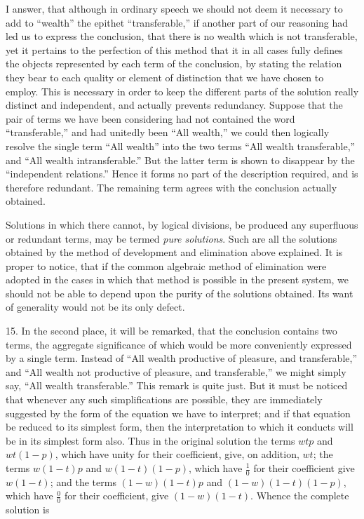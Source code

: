 \documentclass[oneside]{book}
\begin{document}
I answer, that although in ordinary speech we should not
deem it necessary to add to ``wealth'' the epithet ``transferable,''
if another part of our reasoning had led us to express the conclusion,
that there is no wealth which is not transferable, yet it
pertains to the perfection of this method that it in all cases fully
defines the objects represented by each term of the conclusion,
by stating the relation they bear to each quality or element of distinction
that we have chosen to employ. This is necessary in order
to keep the different parts of the solution really distinct and independent,
and actually prevents redundancy. Suppose that the
pair of terms we have been considering had not contained the
word ``transferable,'' and had unitedly been ``All wealth,'' we
could then logically resolve the single term ``All wealth'' into
the two terms ``All wealth transferable,'' and ``All wealth
intransferable.'' But the latter term is shown to disappear by
the ``independent relations.'' Hence it forms no part of the description
required, and is therefore redundant. The remaining
term agrees with the conclusion actually obtained.

Solutions in which there cannot, by logical divisions, be produced
any superfluous or redundant terms, may be termed \textit{pure
solutions}. Such are all the solutions obtained by the method of
development and elimination above explained. It is proper to
notice, that if the common algebraic method of elimination were
adopted in the cases in which that method is possible in the present
system, we should not be able to depend upon the purity of
the solutions obtained. Its want of generality would not be its
only defect.

15. In the second place, it will be remarked, that the conclusion
contains two terms, the aggregate significance of which
would be more conveniently expressed by a single term. Instead
of ``All wealth productive of pleasure, and transferable,'' and
``All wealth not productive of pleasure, and transferable,'' we
might simply say, ``All wealth transferable.'' This remark is
quite just. But it must be noticed that whenever any such simplifications
are possible, they are immediately suggested by the
form of the equation we have to interpret; and if that equation
be reduced to its simplest form, then the interpretation to which
it conducts will be in its simplest form also. Thus in the original
solution the terms $wtp$ and $wt(1 - p)$, which have unity for their
coefficient, give, on addition, $wt$; the terms $w \left(1 - t \right) p$ and
$w \left(1 - t \right) \left(1 - p \right)$, which have $\frac{1}{0}$ for their
coefficient give $w \left(1 - t \right)$;
and the terms $\left(1 - w \right) \left(1 - t \right)p$ and
$\left(1 - w \right) \left(1 - t \right) \left(1 -p \right)$, which
have $\frac{0}{0}$ for their coefficient, give $\left(1 - w \right)
\left(1 - t \right)$. Whence the complete solution is
\end{document}
